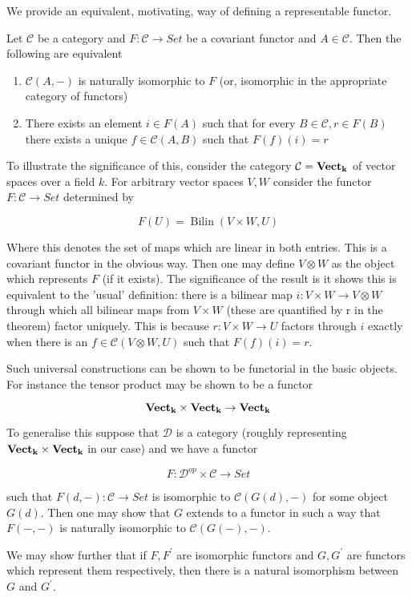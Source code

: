 \documentclass[12pt]{article}
\begin{document}
We provide an equivalent, motivating, way of defining a representable functor.

Let $\mathcal{C}$ be a category and $F : \mathcal{C} \rightarrow Set$ be a covariant functor and $A \in \mathcal{C}$. Then the following are equivalent

\begin{enumerate}
\item $\mathcal{C}(A,-)$ is naturally isomorphic to $F$ (or, isomorphic in the appropriate category of functors)
\item There exists an element $i \in F(A)$ such that for every $B \in \mathcal{C}, r \in F(B)$ there exists a unique $f \in \mathcal{C}(A,B)$ such that $F(f)(i) = r$
\end{enumerate}


To illustrate the significance of this, consider the category $\mathcal{C} = \bf{Vect}_k$ of vector spaces over a field $k$. For arbitrary vector spaces $V, W$ consider the functor $F : \mathcal{C} \rightarrow Set$ determined by

$$ F(U) = \operatorname{Bilin}(V \times W, U) $$

Where this denotes the set of maps which are linear in both entries. This is a covariant functor in the obvious way. Then one may define $V \otimes W$ as the object which represents $F$ (if it exists). The significance of the result is it shows this is equivalent to the 'usual' definition: there is a bilinear map $i : V \times W \rightarrow V \otimes W$ through which all bilinear maps from $V \times W$ (these are quantified by r in the theorem) factor uniquely. This is because $r : V \times W \rightarrow U$ factors through $i$ exactly when there is an $f \in \mathcal{C}(V \otimes W, U)$ such that $F(f)(i) = r$.

Such universal constructions can be shown to be functorial in the basic objects. For instance the tensor product may be shown to be a functor

$$ {\bf{Vect}_k} \times {\bf{Vect}_k} \rightarrow {\bf{Vect}_k} $$

To generalise this suppose that $\mathcal{D}$ is a category (roughly representing ${\bf{Vect}_k} \times {\bf{Vect}_k}$ in our case) and we have a functor

$$ F : \mathcal{D}^{op} \times \mathcal{C} \rightarrow Set $$

such that $F(d,-) : \mathcal{C} \rightarrow Set$ is isomorphic to $\mathcal{C}(G(d),-)$ for some object $G(d)$. Then one may show that $G$ extends to a functor in such a way that $F(-,-)$ is naturally isomorphic to $\mathcal{C}(G(-),-)$.

We may show further that if $F,F^\prime$ are isomorphic functors and $G,G^\prime$ are functors which represent them respectively, then there is a natural isomorphism between $G$ and $G^\prime$.
\end{document}
